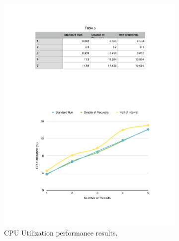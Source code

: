 \begin{figure}[ht!]
\centering
\begin{subfigure}{.5\textwidth}
  \centering
  \includegraphics[width=\linewidth]{./images/cpu_1_lap}
  \caption{CPU Utilization performance results.}
  \label{fig:eval_baseline_cpu}
\end{subfigure}%
\begin{subfigure}{.5\textwidth}
  \centering

\end{subfigure}
\end{figure}
